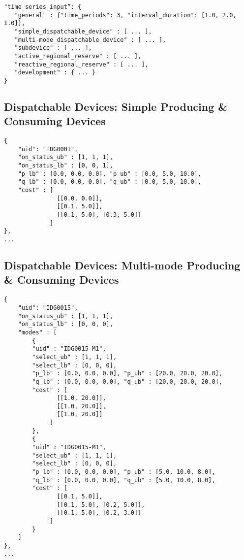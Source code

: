 \begin{verbatim}
"time_series_input”: {
   "general" : {"time_periods": 3, "interval_duration": [1.0, 2.0, 1.0]},   
   "simple_dispatchable_device" : [ ... ],
   "multi-mode_dispatchable_device" : [ ... ],
   "subdevice" : [ ... ],
   "active_regional_reserve" : [ ... ],
   "reactive_regional_reserve" : [ ... ],
   "development" : { ... }
}    
\end{verbatim}


\subsection{Dispatchable Devices: Simple Producing \& Consuming Devices}
\label{sec:generator_time}

\begin{verbatim}
{
    "uid": "IDG0001",
    "on_status_ub" : [1, 1, 1],
    "on_status_lb" : [0, 0, 1],
    "p_lb" : [0.0, 0.0, 0.0], "p_ub" : [0.0, 5.0, 10.0],
    "q_lb" : [0.0, 0.0, 0.0], "q_ub" : [0.0, 5.0, 10.0],
    "cost" : [ 
               [[0.0, 0.0]],
               [[0.1, 5.0]],
               [[0.1, 5.0], [0.3, 5.0]] 
             ]
}, 
... 
\end{verbatim}

\subsection{Dispatchable Devices: Multi-mode Producing \& Consuming Devices}
\label{sec:multi-generator_time}

\begin{verbatim}
{
    "uid": "IDG0015",
    "on_status_ub" : [1, 1, 1],
    "on_status_lb" : [0, 0, 0],
    "modes" : [
        {
        "uid" : "IDG0015-M1",
        "select_ub" : [1, 1, 1],
        "select_lb" : [0, 0, 0],
        "p_lb" : [0.0, 0.0, 0.0], "p_ub" : [20.0, 20.0, 20.0],
        "q_lb" : [0.0, 0.0, 0.0], "q_ub" : [20.0, 20.0, 20.0],
        "cost" : [ 
               [[1.0, 20.0]],
               [[1.0, 20.0]],
               [[1.0, 20.0]] 
             ]    
        },
        {
        "uid" : "IDG0015-M1",
        "select_ub" : [1, 1, 1],
        "select_lb" : [0, 0, 0],
        "p_lb" : [0.0, 0.0, 0.0], "p_ub" : [5.0, 10.0, 8.0],
        "q_lb" : [0.0, 0.0, 0.0], "q_ub" : [5.0, 10.0, 8.0],
        "cost" : [ 
               [[0.1, 5.0]],
               [[0.1, 5.0], [0.2, 5.0]],
               [[0.1, 5.0], [0.2, 3.0]] 
             ]    
        }    
    ] 
}, 
... 
\end{verbatim}

